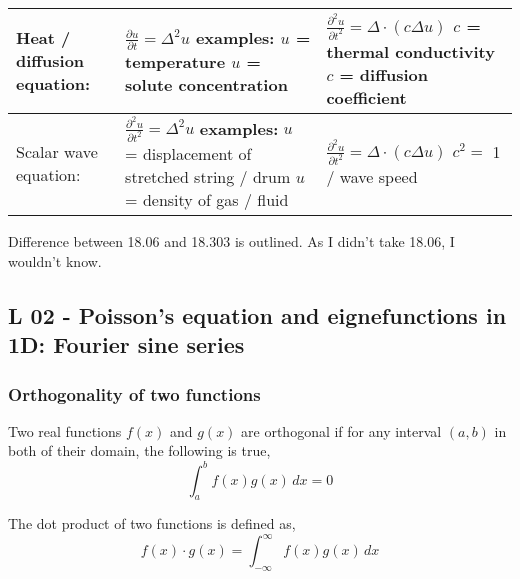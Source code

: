 \documentclass{article}
\theoremstyle{mytheoremstyle}
\theoremstyle{mytheoremstyle}
\theoremstyle{myproblemstyle}
\begin{document}
\begin{center}
\begin{tabular}{ | m{5cm} | m{5cm} | m{5cm} | }
		 \hline
		 Heat / diffusion equation:
		 &
		 $ \frac{\partial u}{\partial t} = \Delta^2 u $ \newline
		 \textbf{examples:} $ u $ = temperature \newline
		 $ u $ = solute concentration
		 &
		$ \frac{\partial^2 u}{\partial t^2} = \Delta \cdot (c \Delta u) $ \newline
		$ c $ = thermal conductivity \newline
		$ c $ = diffusion coefficient \\

		 \hline
		 Scalar wave equation:
		 &
		 $ \frac{\partial^2 u}{\partial t^2} = \Delta^2 u $ \newline
		 \textbf{examples:} \newline
		 $ u $ = displacement of stretched string / drum \newline
		 $ u $= density of gas / fluid 
		 &
		 $ \frac{\partial^2 u}{\partial t^2} = \Delta \cdot (c \Delta u) $ \newline
		 $ c^2 = $ 1 / wave speed \\

		 \hline

    	\end{tabular}
    \end{center}

    \noindent Difference between 18.06 and 18.303 is outlined. As I didn't
    take 18.06, I wouldn't know. 

    \subsection{L 02 - Poisson's equation and eignefunctions in 1D: Fourier sine series}
    \subsubsection{Orthogonality of two functions}
    \noindent Two real functions $ f(x) $ and $ g(x) $ are orthogonal if for any interval 
    $ (a, b) $ in both of their domain, the following is true,
    \begin{equation}
	    \int_{a}^{b} f(x) g(x) \, dx = 0
	    \label{eqn:1}
    \end{equation}
    
    \noindent The dot product of two functions is defined as,
    \begin{equation}
	f(x) \cdot g(x) = \int_{-\infty}^{\infty} f(x) g(x) \, dx
    	\label{eq:2}
    \end{equation}
\end{document}
